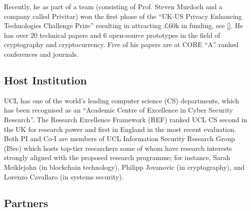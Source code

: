 Recently, he as part of a team (consisting of Prof. Steven Murdoch and a company called Privitar) won the first phase of the “UK-US Privacy Enhancing Technologies Challenge Prize” resulting in attracting £60k in funding, see \href{https://www.ucl.ac.uk/computer-science/news/2022/dec/ucl-computer-sciences-success-privacy-enhancing-technologies-challenge}{[\x]}.  He has over 20 technical papers and 6 open-source prototypes in the field of cryptography and cryptocurrency. Five of his papers are at CORE “A” ranked conferences and journals.


\subsection{Host Institution}
UCL has one of the world's leading computer science (CS) departments, which has been recognised as an “Academic Centre of Excellence in Cyber Security Research”. The Research Excellence Framework (REF) ranked UCL CS second in the UK for research power and first in England in the most recent evaluation. Both PI and Co-I are members of UCL Information Security Research Group (ISec) which hosts top-tier researchers some of whom have research interests strongly aligned with the proposed research programme; for instance, Sarah Meiklejohn  (in blockchain technology), Philipp Jovanovic (in cryptography), and Lorenzo Cavallaro (in systems security). 


\subsection{Partners}





